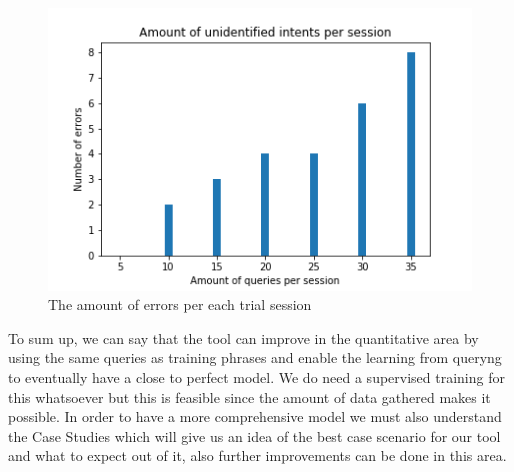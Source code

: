 \begin{figure}[!h]
    \centering
    \includegraphics[scale=0.65]{MA-BA-Thesis/ErrorsValidation.png}
    \caption{The amount of errors per each trial session}
    \label{fig:errorValidation}
\end{figure}
To sum up, we can say that the tool can improve in the quantitative area by using the same queries as training phrases and enable the learning from queryng to eventually have a close to perfect model. We do need a supervised training for this whatsoever but this is feasible since the amount of data gathered makes it possible. In order to have a more comprehensive model we must also understand the Case Studies which will give us an idea of the best case scenario for our tool and what to expect out of it, also further improvements can be done in this area.
